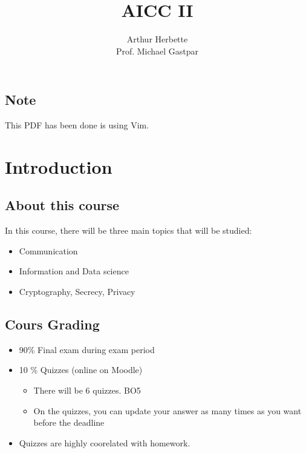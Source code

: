 \documentclass[11pt]{book}
\author{Arthur Herbette \\
Prof. Michael Gastpar}
\begin{document}
\setcounter{section}{8}
\title{AICC II}
\maketitle
\thispagestyle{empty}
\tableofcontents
\thispagestyle{empty}
\listoflectures
\section*{Note}
This PDF has been done is \latex using Vim. 


\chapter{Introduction}
\section{About this course}
In this course, there will be three main topics that will be studied:
\begin{itemize}
    \item Communication
    \item Information and Data science
    \item Cryptography, Secrecy, Privacy
\end{itemize}

\section{Cours Grading}
    \begin{itemize}
        \item 90\% Final exam during exam period
        \item 10 \% Quizzes (online on Moodle)
        \begin{itemize}
            \item There will be $6$ quizzes. BO5
            \item On the quizzes, you can update your answer as many times as you want before the deadline
        \end{itemize}
        \item Quizzes are highly coorelated with homework.
    \end{itemize}
\end{document}
